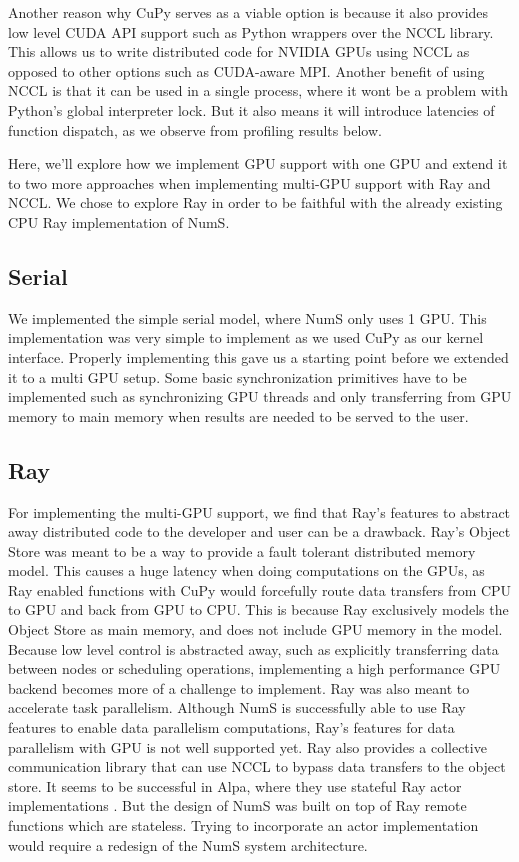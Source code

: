 \documentclass{article}
\begin{document}
Another reason why CuPy serves as a viable option is because it also provides low level CUDA API support such as Python wrappers over the NCCL library. This allows us to write distributed code for NVIDIA GPUs using NCCL as opposed to other options such as CUDA-aware MPI. Another benefit of using NCCL is that it can be used in a single process, where it wont be a problem with Python's global interpreter lock. But it also means it will introduce latencies of function dispatch, as we observe from profiling results below.

Here, we'll explore how we implement GPU support with one GPU and extend it to two more approaches when implementing multi-GPU support with Ray and NCCL. We chose to explore Ray in order to be faithful with the already existing CPU Ray implementation of NumS.

\subsection{Serial}
We implemented the simple serial model, where NumS only uses 1 GPU. This implementation was very simple to implement as we used CuPy as our kernel interface. Properly implementing this gave us a starting point before we extended it to a multi GPU setup. Some basic synchronization primitives have to be implemented such as synchronizing GPU threads and only transferring from GPU memory to main memory when results are needed to be served to the user.

\subsection{Ray}
For implementing the multi-GPU support, we find that Ray's features to abstract away distributed code to the developer and user can be a drawback. Ray's Object Store was meant to be a way to provide a fault tolerant distributed memory model. \cite{ray} This causes a huge latency when doing computations on the GPUs, as Ray enabled functions with CuPy would forcefully route data transfers from CPU to GPU and back from GPU to CPU. This is because Ray exclusively models the Object Store as main memory, and does not include GPU memory in the model. Because low level control is abstracted away, such as explicitly transferring data between nodes or scheduling operations, implementing a high performance GPU backend becomes more of a challenge to implement. Ray was also meant to accelerate task parallelism. Although NumS is successfully able to use Ray features to enable data parallelism computations, Ray's features for data parallelism with GPU is not well supported yet. Ray also provides a collective communication library that can use NCCL to bypass data transfers to the object store. It seems to be successful in Alpa, where they use stateful Ray actor implementations \cite{alpa}. But the design of NumS was built on top of Ray remote functions which are stateless. Trying to incorporate an actor implementation would require a redesign of the NumS system architecture.
\end{document}
